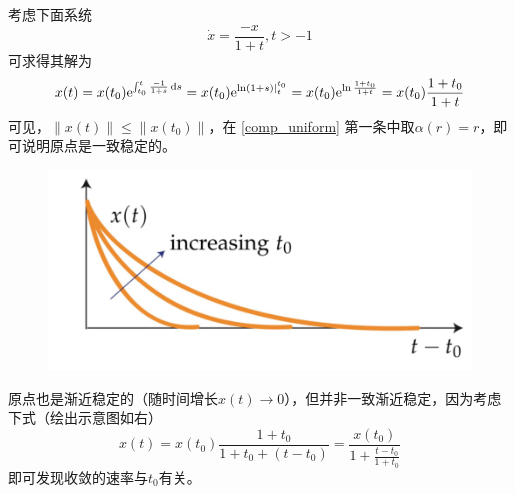 \begin{example}
  考虑下面系统
  \[\dot{x}=\frac{-x}{1+t},t>-1\]
  可求得其解为
  \begin{align*}
    x(t)=x(t_0)\mathrm{e}^{\int_{t_0}^t\frac{-1}{1+s}\mathop{}\!\mathrm{d} s}=x(t_0)\mathrm{e}^{\ln(1+s)|_t^{t_0}}
    =x(t_0)\mathrm{e}^{\ln\frac{1+t_0}{1+t}}=x(t_0)\frac{1+t_0}{1+t}
  \end{align*}
  可见，$\|x(t)\|\le\|x(t_0)\|$，在 \ref{comp_uniform} 第一条中取$\alpha(r)=r$，即可说明原点是一致稳定的。

  \begin{figure}
    \vspace{-1em}
  	\includegraphics[width=0.95\linewidth]{./figure/nonlinear/not_uniform.png}
  \end{figure}

  \vspace{1em}
  原点也是渐近稳定的（随时间增长$x(t)\to0$），但并非一致渐近稳定，因为考虑下式（绘出示意图如右）
  \[x(t)=x(t_0)\frac{1+t_0}{1+t_0+(t-t_0)}=\frac{x(t_0)}{1+\frac{t-t_0}{1+t_0}}\]
  即可发现收敛的速率与$t_0$有关。
\end{example}


